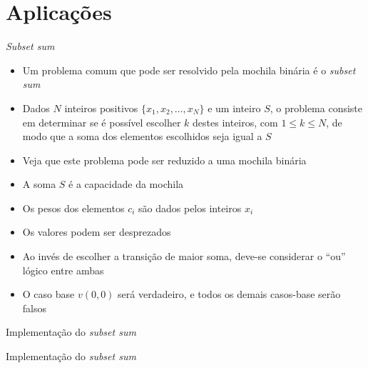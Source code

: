\section{Aplicações}

\begin{frame}[fragile]{\it Subset sum}

    \begin{itemize}
        \item Um problema comum que pode ser resolvido pela mochila binária é o 
            \textit{subset sum}

        \item Dados $N$ inteiros positivos $\{ x_1, x_2, \ldots, x_N \}$ e um inteiro $S$, o 
            problema consiste em determinar se é possível escolher $k$ destes inteiros, com 
            $1\leq k\leq N$, de modo que a soma dos elementos escolhidos seja igual a $S$

        \item Veja que este problema pode ser reduzido a uma mochila binária

        \item A soma $S$ é a capacidade da mochila

        \item Os pesos dos elementos $c_i$ são dados pelos inteiros $x_i$

        \item Os valores podem ser desprezados

        \item Ao invés de escolher a transição de maior soma, deve-se considerar o ``ou''
            lógico entre ambas

        \item O caso base $v(0, 0)$ será verdadeiro, e todos os demais casos-base serão
            falsos
    \end{itemize}

\end{frame}

\begin{frame}[fragile]{Implementação do {\it subset sum}}
\end{frame}

\begin{frame}[fragile]{Implementação do {\it subset sum}}
\end{frame}
